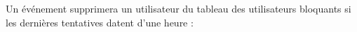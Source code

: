 \documentclass{article}
\begin{document}
\begin{enumerate}
\begin{enumerate}
\begin{enumerate}
        \vspace{0.4cm}
        \hspace*{-1.05in}
               \noindent{}
        
        
        Un événement supprimera un utilisateur du tableau des utilisateurs bloquants si les dernières tentatives datent d'une heure :
        
        \vspace{0.4cm}
        \hspace*{-1.05in}
               \noindent{}
        
        
        
        
        
         \end{enumerate}
        

\end{enumerate}
\end{enumerate}
\end{document}
